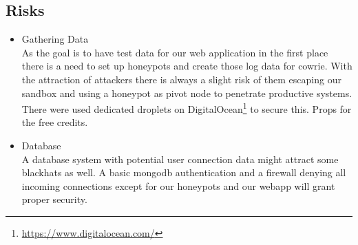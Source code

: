 \documentclass[fontsize=11pt, paper=a4, parskip=half]{scrartcl}
\begin{document}
\subsection{Risks}
\begin{itemize}
	\item Gathering Data \\
	As the goal is to have test data for our web application in the first place there is a need to set up honeypots and create those log data for cowrie. With the attraction of attackers there is always a slight risk of them escaping our sandbox and using a honeypot as pivot node to penetrate productive systems. There were used dedicated droplets on DigitalOcean\footnote{ \url{https://www.digitalocean.com/}} to secure this. Props for the free credits.
	\item Database \\
	A database system with potential user connection data might attract some blackhats as well. A basic mongodb authentication and a firewall denying all incoming connections except for our honeypots and our webapp will grant proper security.
\end{itemize}

\pagebreak
\nocite{*}


\end{document}
